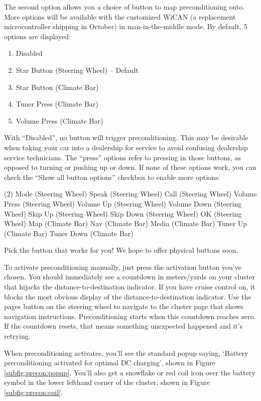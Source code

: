 \documentclass[superscriptaddress,onecolumn,floatfix]{revtex4-2}
\begin{document}
The second option allows you a choice of button to map preconditioning onto. More options will be available with the customized WiCAN (a replacement microcontroller shipping in October) in man-in-the-middle mode. By default, 5 options are displayed:
\begin{enumerate}
  \item Disabled
  \item Star Button (Steering Wheel) -- Default
  \item Star Button (Climate Bar)
  \item Tuner Press (Climate Bar)
  \item Volume Press (Climate Bar)
\end{enumerate}
With ``Disabled'', no button will trigger preconditioning. This may be desirable when taking your car into a dealership for service to avoid confusing dealership service technicians. The ``press'' options refer to pressing in those buttons, as opposed to turning or pushing up or down. If none of these options work, you can check the ``Show all button options'' checkbox to enable more options:
\begin{tasks}(2)
  \task Mode (Steering Wheel)
  \task Speak (Steering Wheel)
  \task Call (Steering Wheel)
  \task Volume Press (Steering Wheel)
  \task Volume Up (Steering Wheel)
  \task Volume Down (Steering Wheel)
  \task Skip Up (Steering Wheel)
  \task Skip Down (Steering Wheel)
  \task OK (Steering Wheel)
  \task Map (Climate Bar)
  \task Nav (Climate Bar)
  \task Media (Climate Bar)
  \task Tuner Up (Climate Bar)
  \task Tuner Down (Climate Bar)
\end{tasks}
Pick the button that works for you! We hope to offer physical buttons soon.

To activate preconditioning manually, just press the activation button you've chosen. You should immediately see a countdown in meters/yards on your cluster that hijacks the distance-to-destination indicator. If you have cruise control on, it blocks the most obvious display of the distance-to-destination indicator. Use the pages button on the steering wheel to navigate to the cluster page that shows navigation instructions. Preconditioning starts when this countdown reaches zero. If the countdown resets, that means something unexpected happened and it's retrying. 

When preconditioning activates, you'll see the standard popup saying, `Battery preconditioning activated for optimal DC charging', shown in Figure \ref{subfig:precon:popup}. You'll also get a snowflake or red coil icon over the battery symbol in the lower lefthand corner of the cluster, shown in Figure \ref{subfig:precon:coil}.
\end{document}

